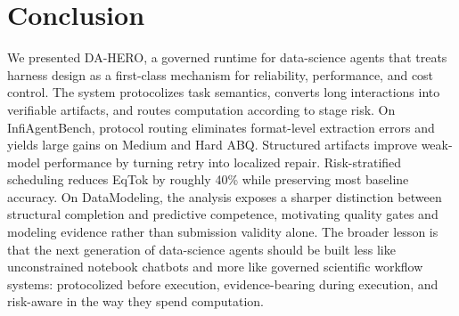 \documentclass[letterpaper]{article} %
\begin{document}
\section{Conclusion}

We presented DA-HERO, a governed runtime for data-science agents that treats harness design as a first-class mechanism for reliability, performance, and cost control.  The system protocolizes task semantics, converts long interactions into verifiable artifacts, and routes computation according to stage risk.  On InfiAgentBench, protocol routing eliminates format-level extraction errors and yields large gains on Medium and Hard ABQ.  Structured artifacts improve weak-model performance by turning retry into localized repair.  Risk-stratified scheduling reduces EqTok by roughly 40\% while preserving most baseline accuracy.  On DataModeling, the analysis exposes a sharper distinction between structural completion and predictive competence, motivating quality gates and modeling evidence rather than submission validity alone.  The broader lesson is that the next generation of data-science agents should be built less like unconstrained notebook chatbots and more like governed scientific workflow systems: protocolized before execution, evidence-bearing during execution, and risk-aware in the way they spend computation.


\end{document}
